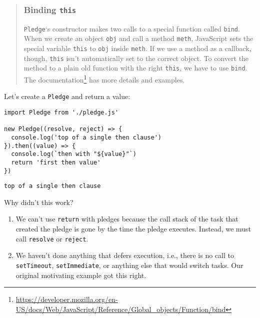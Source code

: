 \documentclass[krantzl]{krantz}
\newenvironment{callout}{\savenotes\begin{tBox}\begin{quotation}\toggletrue{inbox}\renewcommand{\thempfootnote}{\arabic{footnote}}}{\end{quotation}\vspace{\baselineskip}\end{tBox}\togglefalse{inbox}\spewnotes}
\newcommand{\hreffoot}[2]{{#1}\footnote{\href{#2}{#2}}}
\begin{document}
\begin{callout}


\subsubsection*{Binding \texttt{this}}


\texttt{Pledge}‘s constructor makes two calls to a special function called \texttt{bind}.
When we create an object \texttt{obj} and call a method \texttt{meth},
JavaScript sets the special variable \texttt{this} to \texttt{obj} inside \texttt{meth}.
If we use a method as a callback,
though,
\texttt{this} isn’t automatically set to the correct object.
To convert the method to a plain old function with the right \texttt{this},
we have to use \texttt{bind}.
\hreffoot{The documentation}{https://developer.mozilla.org/en-US/docs/Web/JavaScript/Reference/Global\_objects/Function/bind} has more details and examples.

\end{callout}


Let’s create a \texttt{Pledge} and return a value:


\begin{lstlisting}[frame=tblr]
import Pledge from './pledge.js'

new Pledge((resolve, reject) => {
  console.log('top of a single then clause')
}).then((value) => {
  console.log(`then with "${value}"`)
  return 'first then value'
})
\end{lstlisting}



\begin{lstlisting}[frame=tblr,backgroundcolor=\color{black!5}]
top of a single then clause
\end{lstlisting}



\noindent Why didn’t this work?

\begin{enumerate}

\item 

We can’t use \texttt{return} with pledges
    because the call stack of the task that created the pledge is gone
    by the time the pledge executes.
    Instead, we must call \texttt{resolve} or \texttt{reject}.



\item 

We haven’t done anything that defers execution,
    i.e.,
    there is no call to \texttt{setTimeout}, \texttt{setImmediate},
    or anything else that would switch tasks.
    Our original motivating example got this right.



\end{enumerate}
\end{document}
